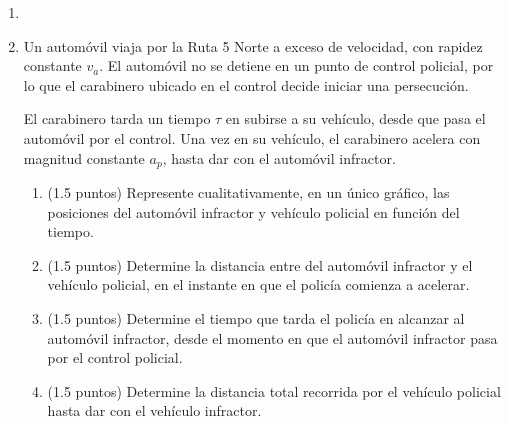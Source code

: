 \documentclass[letterpaper,11pt]{article}
\begin{document}
\vspace{-1cm}
\begin{enumerate}\setlength{\itemsep}{0.4cm}


\item[]


\item Un automóvil viaja por la Ruta 5 Norte a exceso de velocidad, con rapidez constante $v_a$. El automóvil no se detiene en un punto de control policial, por lo que el carabinero ubicado en el control decide iniciar una persecución.

El carabinero tarda un tiempo $\tau$ en subirse a su vehículo, desde que pasa el automóvil por el control. Una vez en su vehículo, el carabinero acelera con magnitud constante $a_p$, hasta dar con el automóvil infractor.

\begin{enumerate}
    \item (1.5 puntos) Represente cualitativamente, en un único gráfico, las posiciones del automóvil infractor y vehículo policial en función del tiempo.
    \item (1.5 puntos) Determine la distancia entre del automóvil infractor y el vehículo policial, en el instante en que el policía comienza a acelerar.
    \item (1.5 puntos) Determine el tiempo que tarda el policía en alcanzar al automóvil infractor, desde el momento en que el automóvil infractor pasa por el control policial.
    \item (1.5 puntos) Determine la distancia total recorrida por el vehículo policial hasta dar con el vehículo infractor.
\end{enumerate}

\hline

%   

\end{enumerate}
\end{document}
